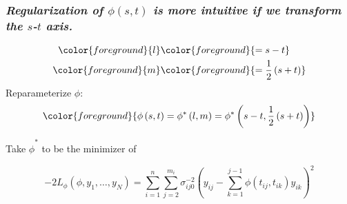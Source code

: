 \documentclass[12pt]{beamer}
\newcommand{\newmaththought}[1]{{ \color{foreground} {#1}}}
\begin{document}
\begin{frame}
\frametitle{\emph{Regularization of $\phi\left(s,t\right)$ is more intuitive if we transform the $s$-$t$ axis. }}

\begin{align*}
\newmaththought{l} &\newmaththought{= s-t} \\
\newmaththought{m} &\newmaththought{= \frac{1}{2}\left(s+t\right)}
\end{align*}
\noindent
Reparameterize $\phi$:
\begin{align*}
\newmaththought{\phi\left(s,t\right) =\phi^*\left(l,m\right)= \phi^*\left(s-t, \frac{1}{2}\left(s+t\right)\right)}
\end{align*}

Take $\hat{\phi}^*$ to be the minimizer of 
\begin{adjustwidth}{-2cm}{-2cm}
\begin{equation}
-2 L_\phi\left(\phi, y_1, \dots,y_N \right) = \sum_{i=1}^n \sum_{j=2}^{m_i} \sigma_{ij0}^{-2} \left(y_{ij} - \sum_{k=1}^{j-1}\phi\left({t_{ij},t_{ik}}\right)y_{ik} \right)^2 \label{loglikelihood}
\end{equation}
\end{adjustwidth}

\end{frame}






%
%
\end{document}
